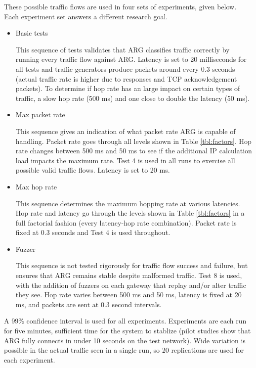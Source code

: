 \par These possible traffic flows are used in four sets of experiments, given below. Each experiment set answers a different research goal.
\begin{itemize}
	\item Basic tests
	\par This sequence of tests validates that \ac{ARG} classifies traffic correctly by running every traffic flow against \ac{ARG}. Latency is set to 20 milliseconds for all tests and traffic generators produce packets around every 0.3 seconds (actual traffic rate is higher due to responses and \ac{TCP} acknowledgement packets). To determine if hop rate has an large impact on certain types of traffic, a slow hop rate (500 ms) and one close to double the latency (50 ms).

	\item Max packet rate
	\par This sequence gives an indication of what packet rate \ac{ARG} is capable of handling. Packet rate goes through all levels shown in Table \ref{tbl:factors}. Hop rate changes between 500 ms and 50 ms to see if the additional \ac{IP} calculation load impacts the maximum rate. Test 4 is used in all runs to exercise all possible valid traffic flows. Latency is set to 20 ms.

	\item Max hop rate
	\par This sequence determines the maximum hopping rate at various latencies. Hop rate and latency go through the levels shown in Table \ref{tbl:factors} in a full factorial fashion (every latency-hop rate combination). Packet rate is fixed at 0.3 seconds and Test 4 is used throughout.

	\item Fuzzer
	\par This sequence is not tested rigorously for traffic flow success and failure, but ensures that \ac{ARG} remains stable despite malformed traffic. Test 8 is used, with the addition of fuzzers on each gateway that replay and/or alter traffic they see. Hop rate varies between 500 ms and 50 ms, latency is fixed at 20 ms, and packets are sent at 0.3 second intervals.
\end{itemize}

\par A 99\% confidence interval is used for all experiments. Experiments are each run for five minutes, sufficient time for the system to stablize (pilot studies show that \ac{ARG} fully connects in under 10 seconds on the test network). Wide variation is possible in the actual traffic seen in a single run, so 20  replications are used for each experiment.

